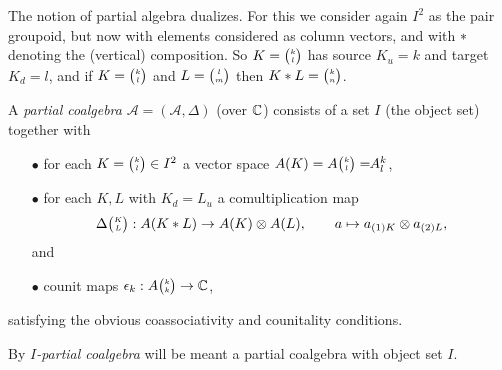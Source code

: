 
The notion of partial algebra dualizes. For this we consider again $I^2$ as the pair groupoid, but now with elements considered as column vectors, and with $*$ denoting the (vertical) composition. So $K={\tiny {\begin{pmatrix} k\\l\end{pmatrix}}}$ has source $K_u = k$ and target $K_d = l$, and if $K={\tiny {\begin{pmatrix} k\\l\end{pmatrix}}}$ and $L={\tiny {\begin{pmatrix} l\\m\end{pmatrix}}}$ then $K* L = {\tiny {\begin{pmatrix} k\\n\end{pmatrix}}}$. %

\begin{Def} A \emph{partial coalgebra} $\mathscr{A}=(\mathscr{A},\Delta)$ (over $\mathbb{C}$) consists of a set $I$ (the object set) together with 
\begin{itemize}
\item[$\bullet$] for each $K={\tiny \begin{pmatrix} k \\ l\end{pmatrix}}\in I^2$ a vector space $A(K) = A{\tiny {\begin{pmatrix} k\\l\end{pmatrix}}}=\!\!A^{k}_{l}$,
\item[$\bullet$] for each $K,L$ with $K_d = L_u$ a comultiplication map \[\Delta{\tiny {\begin{pmatrix} K\\L\end{pmatrix}}}:A(K*L)\rightarrow A(K)\otimes A(L),\qquad a \mapsto a_{(1)K}\otimes a_{(2)L},\] and 
\item[$\bullet$] counit maps $\epsilon_k:A{\tiny {\begin{pmatrix} k\\k\end{pmatrix}}}\rightarrow \mathbb{C}$,
\end{itemize} 
satisfying the obvious coassociativity and counitality conditions.

By \emph{$I$-partial coalgebra} will be meant a partial coalgebra with object set $I$.
\end{Def}

